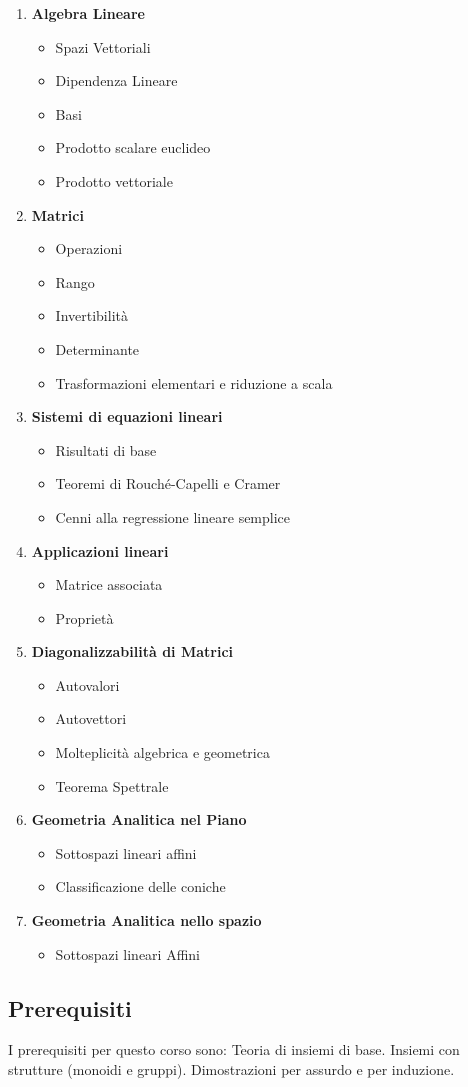\begin{enumerate}
	\item \textbf{Algebra Lineare}
	\begin{itemize}
		\item Spazi Vettoriali
		\item Dipendenza Lineare
		\item Basi
		\item Prodotto scalare euclideo
		\item Prodotto vettoriale
	\end{itemize}
	\item \textbf{Matrici}
	\begin{itemize}	
		\item Operazioni
		\item Rango
		\item Invertibilità
		\item Determinante
		\item Trasformazioni elementari e riduzione a scala 
	\end{itemize}
	\item \textbf{Sistemi di equazioni lineari}
	\begin{itemize}
		\item Risultati di base
		\item Teoremi di Rouché-Capelli e Cramer
		\item Cenni alla regressione lineare semplice
	\end{itemize}
	\item \textbf{Applicazioni lineari}
	\begin{itemize}
		\item Matrice associata
		\item Proprietà
	\end{itemize}
	\item \textbf{Diagonalizzabilità di Matrici}
	\begin{itemize}
		\item Autovalori
		\item Autovettori
		\item Molteplicità algebrica e geometrica
		\item Teorema Spettrale
	\end{itemize}
	\item \textbf{Geometria Analitica nel Piano}
	\begin{itemize}
		\item Sottospazi lineari affini
		\item Classificazione delle coniche
	\end{itemize}
	\item \textbf{Geometria Analitica nello spazio}
	\begin{itemize}
		\item Sottospazi lineari Affini
	\end{itemize}
	
\end{enumerate}

\subsection*{Prerequisiti}
I prerequisiti per questo corso sono:
Teoria di insiemi di base. Insiemi con strutture (monoidi e gruppi). Dimostrazioni per assurdo e per induzione.
